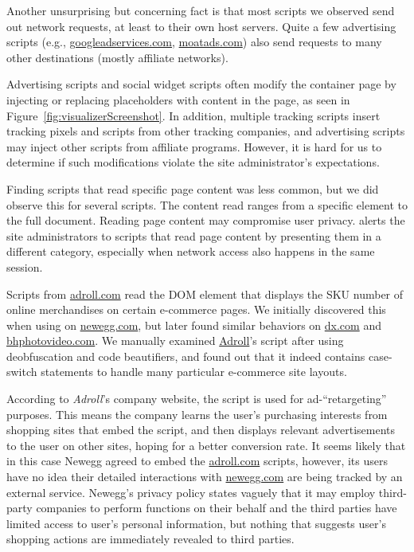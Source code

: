  Another unsurprising but concerning fact is that
most scripts we observed send out network requests, at least to their
own host servers.  Quite a few advertising scripts (e.g.,
\url{googleadservices.com}, \url{moatads.com}) also send requests to
many other destinations (mostly affiliate networks).

 Advertising scripts and social
widget scripts often modify the container page by injecting or replacing
placeholders with content in the page, as seen in
Figure~\ref{fig:visualizerScreenshot}.  In addition, multiple tracking
scripts insert tracking pixels and scripts from other tracking
companies, and advertising scripts may inject other scripts from
affiliate programs.  However, it is hard for us to determine if such
modifications violate the site administrator's expectations.

 Finding scripts that read specific
page content was less common, but we did observe this for several
scripts.  The content read ranges from a specific element to the full
document.  Reading page content may compromise user privacy.  \vis
alerts the site administrators to scripts that read page content by
presenting them in a different category, especially when network access
also happens in the same session.

Scripts from \url{adroll.com} read the DOM element that displays the SKU
number of online merchandises on certain e-commerce pages.  We initially
discovered this when using \vis on \url{newegg.com}, but later found
similar behaviors on \url{dx.com} and \url{bhphotovideo.com}.  We manually examined \url{Adroll}'s script after using
deobfuscation and code beautifiers, and found out that it indeed
contains case-switch statements to handle many particular e-commerce site
layouts.

According to \emph{Adroll}'s company website, the script is used for
ad-``retargeting'' purposes.  This means the company learns the user's
purchasing interests from shopping sites that embed the script, and then
displays relevant advertisements to the user on other sites, hoping for
a better conversion rate.  It seems likely that in this case Newegg
agreed to embed the \url{adroll.com} scripts, however, its users have no
idea their detailed interactions with \url{newegg.com} are being tracked
by an external service.  Newegg's privacy policy states vaguely that it
may employ third-party companies to perform functions on their behalf
and the third parties have limited access to user's personal
information, but nothing that suggests user's shopping actions are
immediately revealed to third parties.

